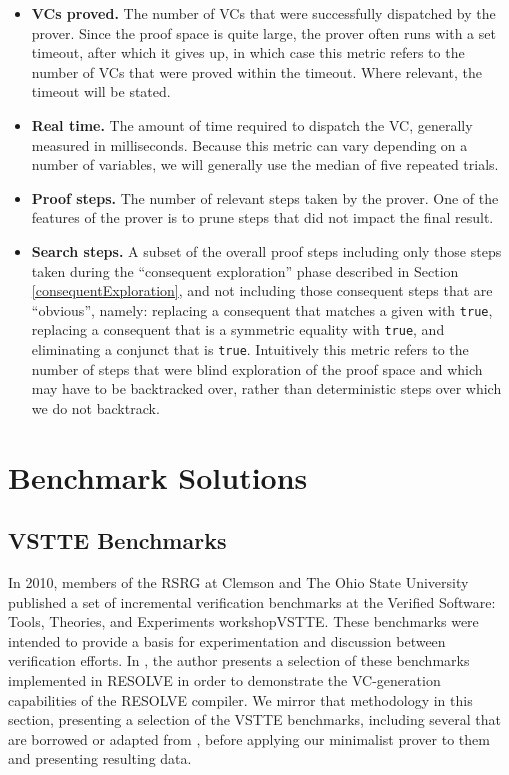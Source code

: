 \begin{itemize}
	\item \textbf{VCs proved.}  The number of VCs that were successfully dispatched by the prover.  Since the proof space is quite large, the prover often runs with a set timeout, after which it gives up, in which case this metric refers to the number of VCs that were proved within the timeout.  Where relevant, the timeout will be stated.
	\item \textbf{Real time.}  The amount of time required to dispatch the VC, generally measured in milliseconds.  Because this metric can vary depending on a number of variables, we will generally use the median of five repeated trials.
	\item \textbf{Proof steps.}  The number of relevant steps taken by the prover.  One of the features of the prover is to prune steps that did not impact the final result.
	\item \textbf{Search steps.}  A subset of the overall proof steps including only those steps taken during the ``consequent exploration'' phase described in Section \ref{consequentExploration}, and not including those consequent steps that are ``obvious'', namely: replacing a consequent that matches a given with \texttt{true}, replacing a consequent that is a symmetric equality with \texttt{true}, and eliminating a conjunct that is \texttt{true}.  Intuitively this metric refers to the number of steps that were blind exploration of the proof space and which may have to be backtracked over, rather than deterministic steps over which we do not backtrack.
\end{itemize}


\section{Benchmark Solutions\label{canProve}}

	\subsection{VSTTE Benchmarks}
In 2010, members of the RSRG at Clemson and The Ohio State University published a set of incremental verification benchmarks at the Verified Software: Tools, Theories, and Experiments workshopVSTTE\cite{benchmarks}.  These benchmarks were intended to provide a basis for experimentation and discussion between verification efforts.  In \cite{heatherDissertation}, the author presents a selection of these benchmarks implemented in RESOLVE in order to demonstrate the VC-generation capabilities of the RESOLVE compiler.  We mirror that methodology in this section, presenting a selection of the VSTTE benchmarks, including several that are borrowed or adapted from \cite{heatherDissertation}, before applying our minimalist prover to them and presenting resulting data.
